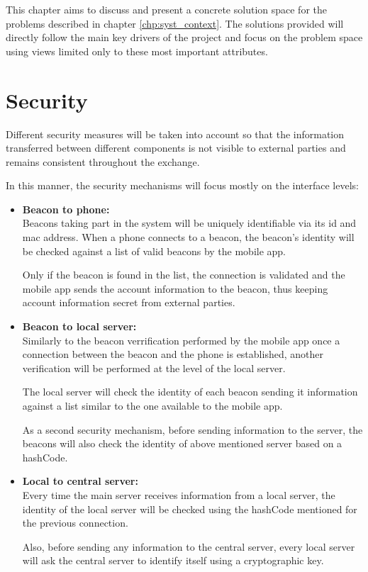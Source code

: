 This chapter aims to discuss and present a concrete solution space for the problems described in chapter  \ref{chp:syst_context}. The solutions provided will directly follow the main key drivers of the project and focus on the problem space using views limited only to these most important attributes.

\section{Security}
Different security measures will be taken into account so that the information transferred between different components is not visible to external parties and remains consistent throughout the exchange.

In this manner, the security mechanisms will focus mostly on the interface levels:

\begin{itemize}
	\item \textbf{Beacon to phone:} \\
	Beacons taking part in the system will be uniquely identifiable via its id and mac address. When a phone connects to a beacon, the beacon's identity will be checked against a list of valid beacons by the mobile app. 
	
	Only if the beacon is found in the list, the connection is validated and the mobile app sends the account information to the beacon, thus keeping account information secret from external parties. 
	\item \textbf{Beacon to local server:} \\
	Similarly to the beacon verrification performed by the mobile app once a connection between the beacon and the phone is established, another verification will be performed at the level of the local server.
	
	The local server will check the identity of each beacon sending it information against a list similar to the one available to the mobile app. 
	
	As a second security mechanism, before sending information to the server, the beacons will also check the identity of above mentioned server based on a hashCode. 
	
	\item \textbf{Local to central server:} \\
	Every time the main server receives information from a local server, the identity of the local server will be checked using the hashCode mentioned for the previous connection. 
	
	Also, before sending any information to the central server, every local server will ask the central server to identify itself using a cryptographic key.
\end{itemize}


